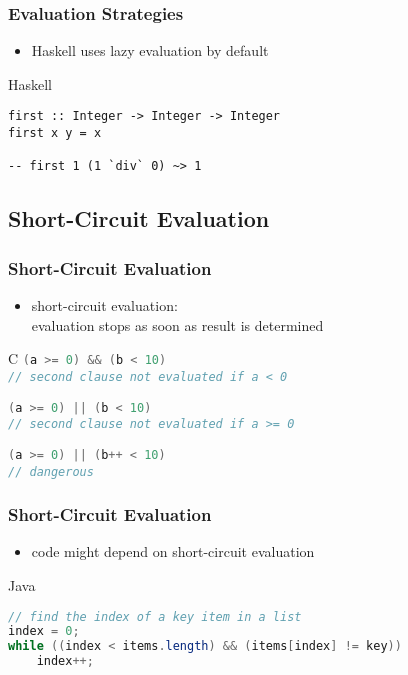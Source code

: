 \documentclass[dvipsnames]{beamer}
\theoremstyle{plain}
\begin{document}
\begin{frame}[fragile]
  \frametitle{Evaluation Strategies}

  \begin{itemize}
    \item Haskell uses lazy evaluation by default
  \end{itemize}

  \begin{exampleblock}{Haskell}
    \begin{lstlisting}
first :: Integer -> Integer -> Integer
first x y = x

-- first 1 (1 `div` 0) ~> 1
    \end{lstlisting}
  \end{exampleblock}
\end{frame}

\subsection{Short-Circuit Evaluation}

\begin{frame}
  \frametitle{Short-Circuit Evaluation}

  \begin{itemize}
    \item \alert{short-circuit evaluation}:\\
      evaluation stops as soon as result is determined
  \end{itemize}

  \pause
  \begin{exampleblock}{C}
    \lstinline[language=C]!(a >= 0) && (b < 10)!\\
    \lstinline[language=C]!// second clause not evaluated if a < 0!

    \bigskip
    \lstinline[language=C]!(a >= 0) || (b < 10)!\\
    \lstinline[language=C]|// second clause not evaluated if a >= 0|

    \pause
    \bigskip
    \lstinline[language=C]!(a >= 0) || (b++ < 10)!\\
    \lstinline[language=C]!// dangerous!
  \end{exampleblock}
\end{frame}

\begin{frame}[fragile]
  \frametitle{Short-Circuit Evaluation}

  \begin{itemize}
    \item code might depend on short-circuit evaluation
  \end{itemize}

  \begin{exampleblock}{Java}
    \begin{lstlisting}[language=Java]
// find the index of a key item in a list
index = 0;
while ((index < items.length) && (items[index] != key))
    index++;
    \end{lstlisting}
  \end{exampleblock}
\end{frame}
\end{document}
